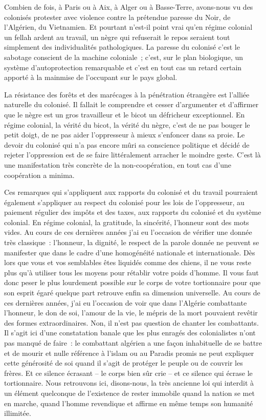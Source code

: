 \documentclass[french,twoside]{book} %
\begin{document}
Combien de fois, à Paris ou à Aix, à Alger ou à Basse-Terre, avons-nous vu des colonisés protester avec violence contre la prétendue paresse du Noir, de l’Algérien, du Vietnamien. Et pourtant n’est-il point vrai qu’en régime colonial un fellah ardent au travail, un nègre qui refuserait le repos seraient tout simplement des individualités pathologiques. La paresse du colonisé c’est le sabotage conscient de la machine coloniale ; c’est, sur le plan biologique, un système d’autoprotection remarquable et c’est en tout cas un retard certain apporté à la mainmise de l’occupant sur le pays global.\par
La résistance des forêts et des marécages à la pénétration étrangère est l’alliée naturelle du colonisé. Il fallait le comprendre et cesser d’argumenter et d’affirmer que le nègre est un gros travailleur et le bicot un défricheur exceptionnel. En régime colonial, la vérité du bicot, la vérité du nègre, c’est de ne pas bouger le petit doigt, de ne pas aider l’oppresseur à mieux s’enfoncer dans sa proie. Le devoir du colonisé qui n’a pas encore mûri sa conscience politique et décidé de rejeter l’oppression est de se faire littéralement arracher le moindre geste. C’est là une manifestation très concrète de la non-coopération, en tout cas d’une coopération a minima.\par
Ces remarques qui s’appliquent aux rapports du colonisé et du travail pourraient également s’appliquer au respect du colonisé pour les lois de l’oppresseur, au paiement régulier des impôts et des taxes, aux rapports du colonisé et du système colonial. En régime colonial, la gratitude, la sincérité, l’honneur sont des mots vides. Au cours de ces dernières années j’ai eu l’occasion de vérifier une donnée très classique : l’honneur, la dignité, le respect de la parole donnée ne peuvent se manifester que dans   le cadre d’une homogénéité nationale et internationale. Dès lors que vous et vos semblables êtes liquidés comme des chiens, il ne vous reste plus qu’à utiliser tous les moyens pour rétablir votre poids d’homme. Il vous faut donc peser le plus lourdement possible sur le corps de votre tortionnaire pour que son esprit égaré quelque part retrouve enfin sa dimension universelle. Au cours de ces dernières années, j’ai eu l’occasion de voir que dans l’Algérie combattante l’honneur, le don de soi, l’amour de la vie, le mépris de la mort pouvaient revêtir des formes extraordinaires. Non, il n’est pas question de chanter les combattants. Il s’agit ici d’une constatation banale que les plus enragés des colonialistes n’ont pas manqué de faire : le combattant algérien a une façon inhabituelle de se battre et de mourir et nulle référence à l’islam ou au Paradis promis ne peut expliquer cette générosité de soi quand il s’agit de protéger le peuple ou de couvrir les frères. Et ce silence écrasant – le corps bien sûr crie – et ce silence qui écrase le tortionnaire. Nous retrouvons ici, disons-nous, la très ancienne loi qui interdit à un élément quelconque de l’existence de rester immobile quand la nation se met en marche, quand l’homme revendique et affirme en même temps son humanité illimitée.\par
\end{document}
